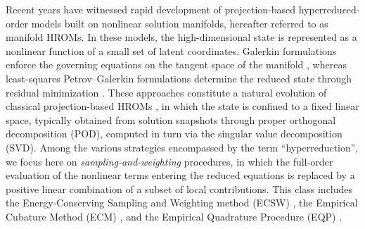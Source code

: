 \documentclass[preprint,10pt]{elsarticle}  %
\begin{document}
Recent years have witnessed rapid development of projection-based
hyperreduced-order models built on nonlinear solution manifolds,
hereafter referred to as manifold HROMs. In these
models, the high-dimensional state is represented as a nonlinear
function of a small set of latent coordinates.
Galerkin formulations enforce the governing equations on the tangent
space of the manifold
\cite{lee2019model,jain2019hyper}, whereas
least-squares Petrov--Galerkin   formulations determine the
reduced state through residual minimization
\cite{lee2019model,barnett2022quadratic,barnett2023neural,chmiel2025unified,
ares2026nonlinear}. These approaches constitute a natural evolution
of classical projection-based HROMs \cite{farhat2014dimensional,hernandez2017dimensional}, in which the state is confined
to a fixed linear space, typically obtained from solution snapshots
through proper orthogonal decomposition (POD), computed in turn via the     singular value decomposition (SVD).
Among the various strategies encompassed by the term
``hyperreduction'',   we focus here on
  \emph{sampling-and-weighting} procedures, in which the full-order evaluation
  of the nonlinear terms entering the reduced equations is
replaced by a positive linear combination of a   subset of local
contributions. This class includes the
Energy-Conserving Sampling and Weighting method (ECSW)
\cite{farhat2014dimensional,farhat2015structure},
the Empirical Cubature Method (ECM)
\cite{hernandez2017dimensional,hernandez2020multiscale}, and the
Empirical Quadrature Procedure (EQP)
\cite{yano2019lp,yano2019discontinuous}.

%
\end{document}

